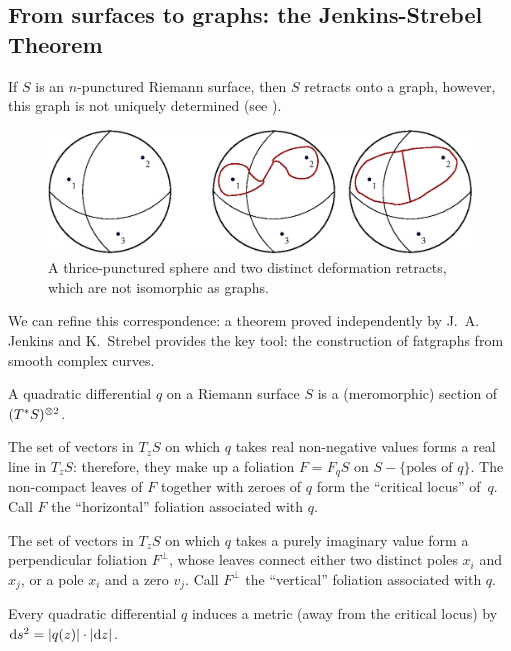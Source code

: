\subsection{From surfaces to graphs: the Jenkins-Strebel Theorem}
\label{sec:strebel}
If $S$ is an $n$-punctured Riemann surface, then $S$ retracts onto a
graph, however, this graph is not uniquely determined (see
).
\begin{figure}[bt]
  \centering\includegraphics[width=\textwidth]{sfera3}
  \caption{A thrice-punctured sphere and two distinct deformation
    retracts, which are not isomorphic as graphs.}
  \label{fig:sphere-retracts}
\end{figure}
We can refine this correspondence: a theorem proved independently by
J.~A. Jenkins \cite{jenkins;annals} and K.~Strebel
\cite{strebel;quadratic-differentials;1983} provides the key tool: the
construction of fatgraphs from smooth complex curves.

\begin{definition}
  A quadratic differential $q$ on a Riemann surface $S$ is a
  (meromorphic) section of $(T^*S)\sp{\otimes 2}$.
\end{definition}
The set of vectors in $T_zS$ on which $q$ takes real non-negative
values forms a real line in $T_zS$: therefore, they make up a
foliation $F = F_qS$ on $S - \{\text{poles of $q$}\}$. The non-compact
leaves of $F$ together with zeroes of $q$ form the ``critical locus''
of~$q$.  Call $F$ the ``horizontal'' foliation associated with $q$.

The set of vectors in $T_zS$ on which $q$ takes a purely imaginary
value form a perpendicular foliation $F^\perp$, whose leaves connect
either two distinct poles $x_i$ and $x_j$, or a pole $x_i$ and a zero
$v_j$.  Call $F^\perp$ the ``vertical'' foliation associated with $q$.

Every quadratic differential $q$ induces a metric (away from the
critical locus) by $\mathrm{d} s^2 = \lvert q(z)\rvert \cdot \lvert\mathrm{d} z\rvert$.


